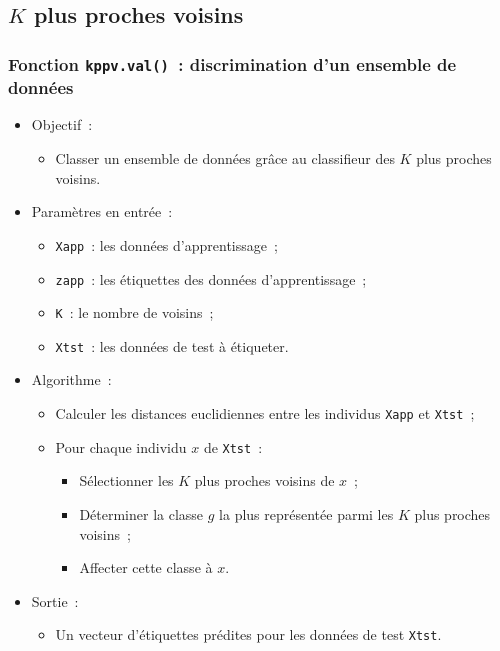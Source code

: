 \documentclass[a4paper,10pt]{report}
\begin{document}
\subsection{$K$ plus proches voisins}


\subsubsection{Fonction \texttt{kppv.val()}~: discrimination d'un ensemble de données}

\begin{itemize}
	\item Objectif~:
	\begin{itemize}
		\item Classer un ensemble de données grâce au classifieur des $K$ plus proches voisins.
	\end{itemize}
	
	\item Paramètres en entrée~:
	\begin{itemize}
		\item \texttt{Xapp}~: les données d'apprentissage~;
		\item \texttt{zapp}~: les étiquettes des données d'apprentissage~;
		\item \texttt{K}~: le nombre de voisins~;
		\item \texttt{Xtst}~: les données de test à étiqueter.
	\end{itemize}

	\item Algorithme~:
	\begin{itemize}
		\item Calculer les distances euclidiennes entre les individus \texttt{Xapp} et \texttt{Xtst}~;
		\item Pour chaque individu $x$ de \texttt{Xtst}~:
		\begin{itemize}
			\item Sélectionner les $K$ plus proches voisins de $x$~;
			\item Déterminer la classe $g$ la plus représentée parmi les $K$ plus proches voisins~;
			\item Affecter cette classe à $x$.
		\end{itemize}
	\end{itemize}

	\item Sortie~:
	\begin{itemize}
		\item Un vecteur d'étiquettes prédites pour les données de test \texttt{Xtst}.
	\end{itemize}
\end{itemize}
\end{document}
